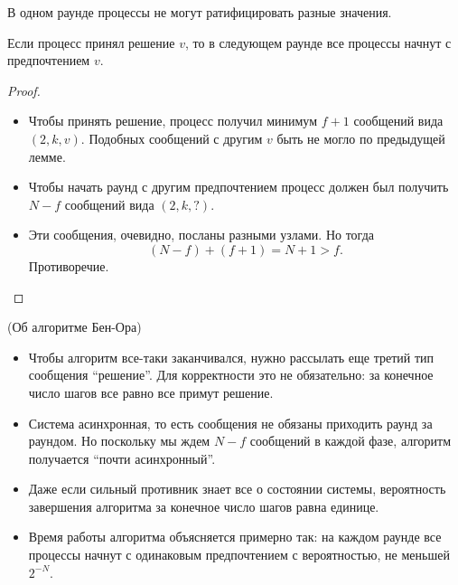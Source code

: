 \begin{lemma}
    В одном раунде процессы не могут ратифицировать разные значения.
\end{lemma}

\begin{lemma}
    Если процесс принял решение $v$, то в следующем раунде все процессы
    начнут с предпочтением $v$.
\end{lemma}
\begin{proof}
    \enewline
    \begin{itemize}
        \item Чтобы принять решение, процесс получил минимум $f + 1$
            сообщений вида $(2, k, v)$. Подобных сообщений с другим
            $v$ быть не могло по предыдущей лемме.
        \item Чтобы начать раунд с другим предпочтением процесс должен был
            получить $N - f$ сообщений вида $(2, k, ?)$.
        \item Эти сообщения, очевидно, посланы разными узлами. Но тогда
            \[
                (N - f) + (f + 1) = N + 1 > f
            .\]
            Противоречие.
    \end{itemize}
\end{proof}

\begin{remark}(Об алгоритме Бен-Ора)
    \enewline
    \begin{itemize}
        \item Чтобы алгоритм все-таки заканчивался, нужно рассылать еще третий
            тип сообщения ``решение''. Для корректности это не обязательно:
            за конечное число шагов все равно все примут решение.
        \item Система асинхронная, то есть сообщения не обязаны приходить
            раунд за раундом. Но поскольку мы ждем $N - f$ сообщений в каждой
            фазе, алгоритм получается ``почти асинхронный''.
        \item Даже если сильный противник знает все о состоянии системы,
            вероятность завершения алгоритма за конечное число шагов
            равна единице.
        \item Время работы алгоритма объясняется примерно так: на каждом
            раунде все процессы начнут с одинаковым предпочтением
            с вероятностью, не меньшей $2^{-N}$.
    \end{itemize}
\end{remark}

